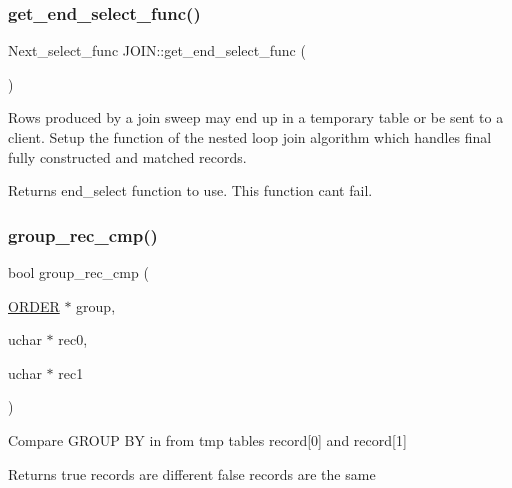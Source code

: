 \subsubsection{\texorpdfstring{get\+\_\+end\+\_\+select\+\_\+func()}{get\_end\_select\_func()}}
{\footnotesize\ttfamily Next\+\_\+select\+\_\+func J\+O\+I\+N\+::get\+\_\+end\+\_\+select\+\_\+func (\begin{DoxyParamCaption}{ }\end{DoxyParamCaption})}

Rows produced by a join sweep may end up in a temporary table or be sent to a client. Setup the function of the nested loop join algorithm which handles final fully constructed and matched records.

\begin{DoxyReturn}{Returns}
end\+\_\+select function to use. This function can\textquotesingle{}t fail. 
\end{DoxyReturn}
\mbox{\label{group__Query__Executor_gaa74e832cc92e35fa5e94c664b367dcad}} 
\subsubsection{\texorpdfstring{group\+\_\+rec\+\_\+cmp()}{group\_rec\_cmp()}}
{\footnotesize\ttfamily bool group\+\_\+rec\+\_\+cmp (\begin{DoxyParamCaption}\item[{\mbox{\hyperlink{structst__order}{O\+R\+D\+ER}} $\ast$}]{group,  }\item[{uchar $\ast$}]{rec0,  }\item[{uchar $\ast$}]{rec1 }\end{DoxyParamCaption})}

Compare G\+R\+O\+UP BY in from tmp table\textquotesingle{}s record\mbox{[}0\mbox{]} and record\mbox{[}1\mbox{]}

\begin{DoxyReturn}{Returns}
true records are different false records are the same 
\end{DoxyReturn}
\mbox{\label{group__Query__Executor_gad4a1cc488b1586d28aa8cfd90bb875df}} 

